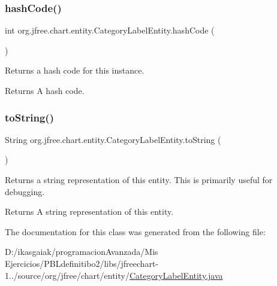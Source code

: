 \subsubsection{\texorpdfstring{hash\+Code()}{hashCode()}}
{\footnotesize\ttfamily int org.\+jfree.\+chart.\+entity.\+Category\+Label\+Entity.\+hash\+Code (\begin{DoxyParamCaption}{ }\end{DoxyParamCaption})}

Returns a hash code for this instance.

\begin{DoxyReturn}{Returns}
A hash code. 
\end{DoxyReturn}
\mbox{\label{classorg_1_1jfree_1_1chart_1_1entity_1_1_category_label_entity_a15d1b33dd90ea892cd04f83d08a372b2}} 
\subsubsection{\texorpdfstring{to\+String()}{toString()}}
{\footnotesize\ttfamily String org.\+jfree.\+chart.\+entity.\+Category\+Label\+Entity.\+to\+String (\begin{DoxyParamCaption}{ }\end{DoxyParamCaption})}

Returns a string representation of this entity. This is primarily useful for debugging.

\begin{DoxyReturn}{Returns}
A string representation of this entity. 
\end{DoxyReturn}


The documentation for this class was generated from the following file\+:\begin{DoxyCompactItemize}
\item 
D\+:/ikasgaiak/programacion\+Avanzada/\+Mis Ejercicios/\+P\+B\+Ldefinitibo2/libs/jfreechart-\/1../source/org/jfree/chart/entity/\mbox{\hyperlink{_category_label_entity_8java}{Category\+Label\+Entity.\+java}}\end{DoxyCompactItemize}
